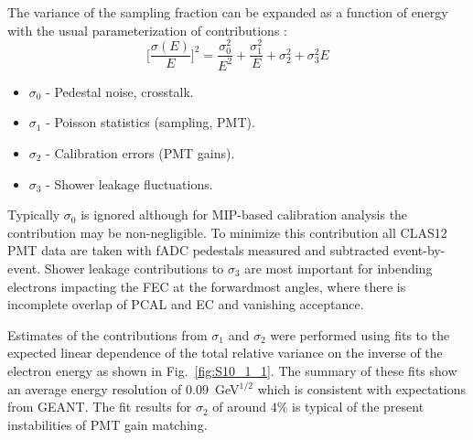 The variance of the sampling fraction can be expanded as a function of energy with the usual parameterization of contributions \cite{ps1981}:
\begin{equation}
\biggl[\frac{\sigma(E)}{E}\biggr]^2 = \frac{\sigma^2_0}{E^2} + \frac{\sigma^2_1}{E} +\sigma^2_2 + \sigma^2_3 E 
\label{eq:sferror}
\end{equation}

\begin{itemize}
\item $\sigma_0$ - Pedestal noise, crosstalk.
\item $\sigma_1$ - Poisson statistics (sampling, PMT).
\item $\sigma_2$ - Calibration errors (PMT gains).
\item $\sigma_3$ - Shower leakage fluctuations.
\end{itemize}

Typically $\sigma_0$ is ignored although for MIP-based calibration analysis the contribution may be non-negligible.  To minimize this contribution all CLAS12 PMT data are taken with fADC pedestals measured and subtracted event-by-event.  Shower leakage contributions to $\sigma_3$ are most important for inbending electrons impacting the FEC at the forwardmost angles, where there is incomplete overlap of PCAL and EC and vanishing acceptance.  

Estimates of the contributions from $\sigma_1$ and $\sigma_2$ were performed using fits to the expected linear dependence of the total relative variance on the inverse of the electron energy as shown in Fig.~\ref{fig:S10_1_1}.  The summary of these fits show an average energy resolution of 0.09~GeV$^{1/2}$ which is consistent with expectations from GEANT.   The fit results for $\sigma_2$ of around $4\%$ is typical of the present instabilities of PMT gain matching.
 
